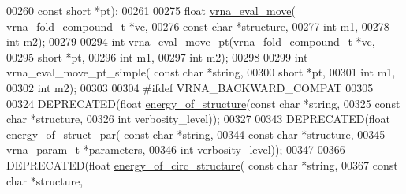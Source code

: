 \begin{DoxyCode}
00260                       \textcolor{keyword}{const} \textcolor{keywordtype}{short} *pt);
00261 
00275 \textcolor{keywordtype}{float} \hyperlink{group__eval_gaff1b9e4f4d17b434b0a822fe783672c1}{vrna\_eval\_move}( \hyperlink{group__fold__compound_structvrna__fc__s}{vrna\_fold\_compound\_t} *vc,
00276                       \textcolor{keyword}{const} \textcolor{keywordtype}{char} *structure,
00277                       \textcolor{keywordtype}{int} m1,
00278                       \textcolor{keywordtype}{int} m2);
00279 
00294 \textcolor{keywordtype}{int} \hyperlink{group__eval_ga123dabc119ea98c968a5e903cc46f0fb}{vrna\_eval\_move\_pt}(\hyperlink{group__fold__compound_structvrna__fc__s}{vrna\_fold\_compound\_t} *vc,
00295                       \textcolor{keywordtype}{short} *pt,
00296                       \textcolor{keywordtype}{int} m1,
00297                       \textcolor{keywordtype}{int} m2);
00298 
00299 \textcolor{keywordtype}{int} vrna\_eval\_move\_pt\_simple( \textcolor{keyword}{const} \textcolor{keywordtype}{char} *\textcolor{keywordtype}{string},
00300                               \textcolor{keywordtype}{short} *pt,
00301                               \textcolor{keywordtype}{int} m1,
00302                               \textcolor{keywordtype}{int} m2);
00303 
00304 \textcolor{preprocessor}{#ifdef VRNA\_BACKWARD\_COMPAT}
00305 
00324 DEPRECATED(\textcolor{keywordtype}{float} \hyperlink{group__eval_gaf93986cb3cb29770ec9cca69c9fab8cf}{energy\_of\_structure}(\textcolor{keyword}{const} \textcolor{keywordtype}{char} *\textcolor{keywordtype}{string},
00325                           \textcolor{keyword}{const} \textcolor{keywordtype}{char} *structure,
00326                           \textcolor{keywordtype}{int} verbosity\_level));
00327 
00343 DEPRECATED(\textcolor{keywordtype}{float} \hyperlink{group__eval_gaf9d064d3c496de42eca6734a96fd2090}{energy\_of\_struct\_par}( \textcolor{keyword}{const} \textcolor{keywordtype}{char} *\textcolor{keywordtype}{string},
00344                             \textcolor{keyword}{const} \textcolor{keywordtype}{char} *structure,
00345                             \hyperlink{group__energy__parameters_structvrna__param__s}{vrna\_param\_t} *parameters,
00346                             \textcolor{keywordtype}{int} verbosity\_level));
00347 
00366 DEPRECATED(\textcolor{keywordtype}{float} \hyperlink{group__eval_gaeb14f3664aec67fc03268ac75253f0f8}{energy\_of\_circ\_structure}( \textcolor{keyword}{const} \textcolor{keywordtype}{char} *\textcolor{keywordtype}{string},
00367                                 \textcolor{keyword}{const} \textcolor{keywordtype}{char} *structure,

\end{DoxyCode}

